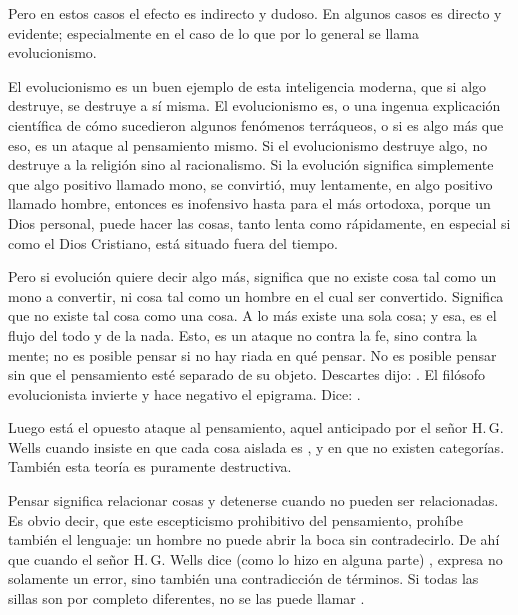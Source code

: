 Pero en estos casos el efecto es indirecto y dudoso. En algunos casos es directo y evidente; especialmente
en el caso de lo que por lo general se llama evolucionismo.

El evolucionismo es un buen ejemplo de esta inteligencia moderna, que si algo destruye, se destruye
a sí misma. El evolucionismo es, o una ingenua explicación científica de cómo sucedieron algunos
fenómenos terráqueos, o si es algo más que eso, es un ataque al pensamiento mismo. Si el evolucionismo
destruye algo, no destruye a la religión sino al racionalismo. Si la evolución significa simplemente que
algo positivo llamado mono, se convirtió, muy lentamente, en algo positivo llamado hombre, entonces es
inofensivo hasta para el más ortodoxa, porque un Dios personal, puede hacer las cosas, tanto lenta como
rápidamente, en especial si como el Dios Cristiano, está situado fuera del tiempo.

Pero si evolución quiere decir algo más, significa que no existe cosa tal como un mono a convertir,
ni cosa tal como un hombre en el cual ser convertido. Significa que no existe tal cosa como una cosa. A lo
más existe una sola cosa; y esa, es el flujo del todo y de la nada. Esto, es un ataque no contra la fe, sino
contra la mente; no es posible pensar si no hay riada en qué pensar. No es posible pensar sin que el
pensamiento esté separado de su objeto. Descartes dijo: . El filósofo
evolucionista invierte y hace negativo el epigrama. Dice: .

Luego está el opuesto ataque al pensamiento, aquel anticipado por el señor H.\,G. Wells cuando
insiste en que cada cosa aislada es , y en que no existen categorías. También esta teoría es
puramente destructiva.

Pensar significa relacionar cosas y detenerse cuando no pueden ser relacionadas. Es obvio decir,
que este escepticismo prohibitivo del pensamiento, prohíbe también el lenguaje: un hombre no puede
abrir la boca sin contradecirlo. De ahí que cuando el señor H.\,G. Wells dice (como lo hizo en alguna
parte) , expresa no solamente un error, sino también una
contradicción de términos. Si todas las sillas son por completo diferentes, no se las puede llamar .

